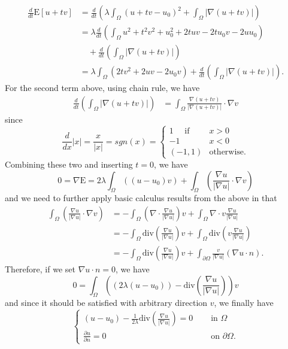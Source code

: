 \documentclass[fontsize=12pt]{article}
\begin{document}
\begin{align*}
\frac{d}{dt} \mathrm{E}[u+tv]
&= \frac{d}{dt} \left( \lambda \int_{\Omega} (u + tv - u_0)^2 + \int_{\Omega} | \nabla (u+tv) | \right)\\
&= \lambda \frac{d}{dt} \left( \int_{\Omega} u^2 + t^2 v^2 + u_0^2 + 2tuv - 2tu_0 v -2uu_0 \right) \\&\quad  + \frac{d}{dt} \left( \int_{\Omega} | \nabla ( u + tv ) | \right)\\
&= \lambda \int_{\Omega} (2tv^2 + 2uv - 2u_0 v )+ \frac{d}{dt}\left( \int_{\Omega} | \nabla ( u + tv) | \right).
\end{align*}
For the second term above, using chain rule, we have
\begin{align*}
\frac{d}{dt} \left( \int_{\Omega} | \nabla ( u + tv) | \right)
&= \int_{\Omega} \frac{\nabla ( u + tv)}{|\nabla ( u + tv)|} \cdot \nabla v
\end{align*}
since
\begin{equation*}
\frac{d}{dx} |x| = \frac{x}{|x|} = sgn(x) = 
\begin{cases}
1 \quad \text{ if } ~& x > 0 \\
-1  & x < 0\\
(-1,1) & \text{otherwise}.
\end{cases}
\end{equation*}
Combining these two and inserting $t = 0$, we have
\begin{equation}
0 = \nabla \mathrm{E} = 2\lambda \int_{\Omega} \left( (u - u_0) v \right) +  \int_{\Omega} \left(\frac{\nabla u}{|\nabla u|} \cdot \nabla v \right)
\end{equation}
and we need to further apply basic calculus results from the above in that
\begin{align*}
\int_{\Omega} \left(\frac{\nabla u}{|\nabla u|} \cdot \nabla v \right)
&= - \int_{\Omega} \left( \nabla \cdot \frac{\nabla u}{|\nabla u|} \right) v
+ \int_{\Omega} \nabla \cdot v \frac{\nabla u}{|\nabla u|}\\
&= - \int_{\Omega} \mathrm{div} \left( \frac{\nabla u}{|\nabla u|} \right)v
+ \int_{\Omega} \mathrm{div} \left( v \frac{\nabla u}{|\nabla u|}\right) \\
&= - \int_{\Omega} \mathrm{div} \left( \frac{\nabla u}{|\nabla u|} \right)v
+ \int_{\partial \Omega} \frac{v}{|\nabla u|} \left( \nabla u \cdot n \right).
\end{align*}
Therefore, if we set $\nabla u \cdot n = 0$, we have
\begin{equation}
0 = \int_{\Omega} \left(\left(2\lambda(u-u_0) \right) - \mathrm{div}\left( \frac{\nabla u}{|\nabla u|}\right)\right)v
\end{equation}
and since it should be satisfied with arbitrary direction $v$, we finally have
\begin{equation}
\begin{cases}
(u-u_0) - \frac{1}{2\lambda} \mathrm{div} \left( \frac{\nabla u}{|\nabla u|} \right)=0\quad& \text{ in } \Omega\\
\frac{\partial u}{\partial n} = 0 & \text{ on } \partial \Omega.
\end{cases}
\end{equation}
\end{document}

